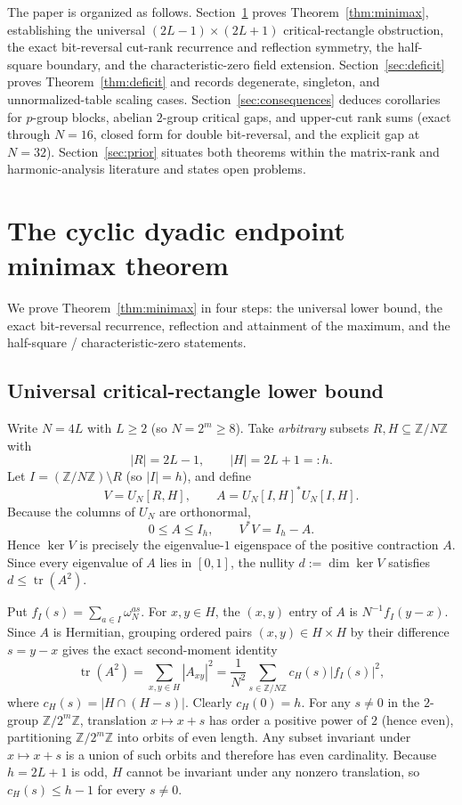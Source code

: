 \documentclass[11pt,reqno]{amsart}
\numberwithin{equation}{section}
\theoremstyle{definition}
\theoremstyle{remark}
\newcommand{\Z}{\mathbb{Z}}
\newcommand{\tr}{\operatorname{tr}}
\begin{document}
The paper is organized as follows. Section~\ref{sec:minimax} proves Theorem~\ref{thm:minimax}, establishing the universal $(2L-1)\times(2L+1)$ critical-rectangle obstruction, the exact bit-reversal cut-rank recurrence and reflection symmetry, the half-square boundary, and the characteristic-zero field extension. Section~\ref{sec:deficit} proves Theorem~\ref{thm:deficit} and records degenerate, singleton, and unnormalized-table scaling cases. Section~\ref{sec:consequences} deduces corollaries for $p$-group blocks, abelian $2$-group critical gaps, and upper-cut rank sums (exact through $N=16$, closed form for double bit-reversal, and the explicit gap at $N=32$). Section~\ref{sec:prior} situates both theorems within the matrix-rank and harmonic-analysis literature and states open problems.

\section{The cyclic dyadic endpoint minimax theorem}
\label{sec:minimax}

We prove Theorem~\ref{thm:minimax} in four steps: the universal lower bound, the exact bit-reversal recurrence, reflection and attainment of the maximum, and the half-square / characteristic-zero statements.

\subsection{Universal critical-rectangle lower bound}

Write $N = 4L$ with $L\ge 2$ (so $N=2^m\ge 8$). Take \emph{arbitrary} subsets $R,H\subseteq\Z/N\Z$ with
\[
|R| = 2L - 1,\qquad |H| = 2L + 1 =: h.
\]
Let $I = (\Z/N\Z)\setminus R$ (so $|I|=h$), and define
\[
V = U_N[R,H],\qquad A = U_N[I,H]^* U_N[I,H].
\]
Because the columns of $U_N$ are orthonormal,
\begin{equation}
\label{eq:gram-comp}
0 \le A \le I_h,\qquad V^*V = I_h - A.
\end{equation}
Hence $\ker V$ is precisely the eigenvalue-$1$ eigenspace of the positive contraction $A$. Since every eigenvalue of $A$ lies in $[0,1]$, the nullity $d := \dim\ker V$ satisfies $d \le \tr(A^2)$.

Put $f_I(s) = \sum_{a\in I}\omega_N^{as}$. For $x,y\in H$, the $(x,y)$ entry of $A$ is $N^{-1}f_I(y-x)$. Since $A$ is Hermitian, grouping ordered pairs $(x,y)\in H\times H$ by their difference $s=y-x$ gives the exact second-moment identity
\begin{equation}
\label{eq:trace-moment}
\tr(A^2) = \sum_{x,y\in H}|A_{xy}|^2 = \frac{1}{N^2}\sum_{s\in\Z/N\Z} c_H(s)|f_I(s)|^2,
\end{equation}
where $c_H(s) = |H\cap(H-s)|$. Clearly $c_H(0)=h$. For any $s\neq 0$ in the $2$-group $\Z/2^m\Z$, translation $x\mapsto x+s$ has order a positive power of $2$ (hence even), partitioning $\Z/2^m\Z$ into orbits of even length. Any subset invariant under $x\mapsto x+s$ is a union of such orbits and therefore has even cardinality. Because $h=2L+1$ is odd, $H$ cannot be invariant under any nonzero translation, so $c_H(s)\le h-1$ for every $s\neq 0$.
\end{document}
